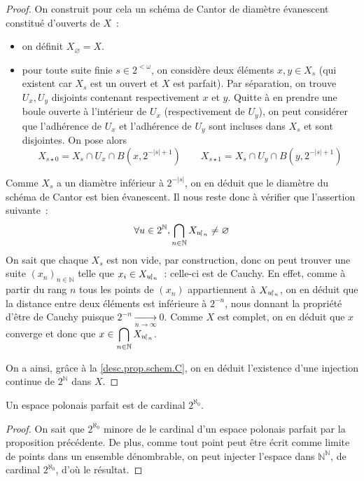 \begin{proof}
  On construit pour cela un schéma de Cantor de diamètre évanescent constitué
  d'ouverts de $X$~:
  \begin{itemize}
  \item on définit $X_\varnothing = X$.
  \item pour toute suite finie $s\in 2^{<\omega}$, on considère deux éléments
    $x,y\in X_s$ (qui existent car $X_s$ est un ouvert et $X$ est parfait). Par
    séparation, on trouve $U_x,U_y$ disjoints contenant respectivement $x$ et
    $y$. Quitte à en prendre une boule ouverte à l'intérieur de $U_x$
    (respectivement de $U_y$), on peut considérer que l'adhérence de
    $U_x$ et l'adhérence de $U_y$ sont incluses dans $X_s$ et sont disjointes.
    On pose alors
    \[X_{s\star 0} = X_s\cap U_x \cap B(x,2^{-|s|+1})\qquad
    X_{s\star 1} = X_s\cap U_y \cap B(y,2^{-|s|+1})\]
  \end{itemize}
  Comme $X_s$ a un diamètre inférieur à $2^{-|s|}$, on en déduit que le diamètre
  du schéma de Cantor est bien évanescent. Il nous reste donc à vérifier que
  l'assertion suivante~:
  \[\forall u\in 2^\mathbb N,\bigcap_{n \in \mathbb N}X_{u\!\upharpoonright_{n}}
  \neq\varnothing\]
  On sait que chaque $X_s$ est non vide, par construction, donc on peut trouver
  une suite $(x_n)_{n\in\mathbb N}$ telle que $x_i\in X_{u\!\upharpoonright_{n}}$~: celle-ci
  est de Cauchy. En effet, comme à partir du rang $n$ tous les points de
  $(x_n)$ appartiennent à $X_{u\!\upharpoonright_{n}}$, on en déduit que la distance entre
  deux éléments est inférieure à $2^{-n}$, nous donnant la propriété d'être de
  Cauchy puisque $2^{-n} \xrightarrow[n\to\infty]{} 0$. Comme $X$ est complet,
  on en déduit que $x$ converge et donc que
  $\displaystyle x\in\bigcap_{n\in\mathbb N} X_{u\!\upharpoonright_{n}}$.

  On a ainsi, grâce à la \cref{desc.prop.schem.C}, on en déduit l'existence
  d'une injection continue de $2^\mathbb N$ dans $X$.
\end{proof}

\begin{corollary}
  Un espace polonais parfait est de cardinal $2^{\aleph_0}$.
\end{corollary}

\begin{proof}
  On sait que $2^{\aleph_0}$ minore de le cardinal d'un espace polonais parfait
  par la proposition précédente. De plus, comme tout point peut être écrit
  comme limite de points dans un ensemble dénombrable, on peut injecter l'espace
  dans $\mathbb N^\mathbb N$, de cardinal $2^{\aleph_0}$, d'où le résultat.
\end{proof}

